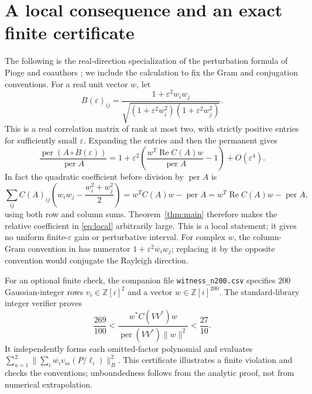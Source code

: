 \documentclass[11pt]{article}
\DeclareMathOperator{\per}{per}
\DeclareMathOperator{\Ree}{Re}
\begin{document}
\section{A local consequence and an exact finite certificate}
The following is the real-direction specialization of the perturbation formula
of Pioge and coauthors \cite[Lemma~1]{pioge}; we include the calculation to fix
the Gram and conjugation conventions. For a real unit vector $w$, let
\[
 B(\varepsilon)_{ij}=
 \frac{1+\varepsilon^2w_iw_j}
 {\sqrt{(1+\varepsilon^2w_i^2)(1+\varepsilon^2w_j^2)}}.
\]
This is a real correlation matrix of rank at most two, with strictly positive
entries for sufficiently small $\varepsilon$. Expanding the entries and then
the permanent gives
\begin{equation}\label{eq:local}
 \frac{\per(A\circ B(\varepsilon))}{\per A}
 =1+\varepsilon^2\left(\frac{w^T\Ree C(A)w}{\per A}-1\right)
       +O(\varepsilon^4).
\end{equation}
In fact the quadratic coefficient before division by $\per A$ is
\[
 \sum_{ij}C(A)_{ij}\left(w_iw_j-\frac{w_i^2+w_j^2}{2}\right)
 =w^TC(A)w-\per A=w^T\Ree C(A)w-\per A,
\]
using both row and column sums. Theorem~\ref{thm:main} therefore makes the
relative coefficient in \eqref{eq:local} arbitrarily large. This is a local
statement; it gives no uniform finite-$\varepsilon$ gain or perturbative interval.
For complex $w$, the column-Gram convention in \cite{pioge} has numerator
$1+\varepsilon^2\overline{w_i}w_j$; replacing it by the opposite convention
would conjugate the Rayleigh direction.

For an optional finite check, the companion file \texttt{witness\_n200.csv}
specifies $200$ Gaussian-integer rows $v_i\in\mathbb Z[i]^2$ and a vector
$w\in\mathbb Z[i]^{200}$. The standard-library integer verifier proves
\[
 \frac{269}{100}<\frac{w^*C(VV^*)w}{\per(VV^*)\|w\|^2}<\frac{27}{10}.
\]
It independently forms each omitted-factor polynomial and evaluates
$\sum_{a=1}^2\|\sum_i\overline{w_i}v_{ia}(P/\ell_i)\|_B^2$.
This certificate illustrates a finite violation and checks the conventions;
unboundedness follows from the analytic proof, not from numerical extrapolation.
\end{document}
